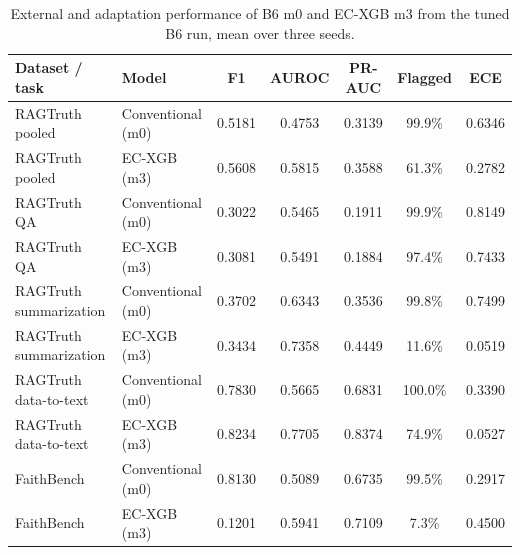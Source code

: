\documentclass[a4paper,fleqn]{cas-sc}
\begin{document}
\begin{table}[pos=htbp]
  \centering
  \caption{External and adaptation performance of B6 m0 and EC-XGB m3 from the tuned B6 run, mean over three seeds.}
  \label{tab:shift}
  \begin{tabular}{llccccc}
    \toprule
    \textbf{Dataset / task} & \textbf{Model} & \textbf{F1} & \textbf{AUROC} & \textbf{PR-AUC} & \textbf{Flagged} & \textbf{ECE} \\
    \midrule
    RAGTruth pooled         & Conventional (m0) & 0.5181      & 0.4753         & 0.3139          & 99.9\%           & 0.6346       \\
    RAGTruth pooled         & EC-XGB (m3)       & 0.5608      & 0.5815         & 0.3588          & 61.3\%           & 0.2782       \\
    \addlinespace
    RAGTruth QA             & Conventional (m0) & 0.3022      & 0.5465         & 0.1911          & 99.9\%           & 0.8149       \\
    RAGTruth QA             & EC-XGB (m3)       & 0.3081      & 0.5491         & 0.1884          & 97.4\%           & 0.7433       \\
    \addlinespace
    RAGTruth summarization  & Conventional (m0) & 0.3702      & 0.6343         & 0.3536          & 99.8\%           & 0.7499       \\
    RAGTruth summarization  & EC-XGB (m3)       & 0.3434      & 0.7358         & 0.4449          & 11.6\%           & 0.0519       \\
    \addlinespace
    RAGTruth data-to-text   & Conventional (m0) & 0.7830      & 0.5665         & 0.6831          & 100.0\%          & 0.3390       \\
    RAGTruth data-to-text   & EC-XGB (m3)       & 0.8234      & 0.7705         & 0.8374          & 74.9\%           & 0.0527       \\
    \addlinespace
    FaithBench              & Conventional (m0) & 0.8130      & 0.5089         & 0.6735          & 99.5\%           & 0.2917       \\
    FaithBench              & EC-XGB (m3)       & 0.1201      & 0.5941         & 0.7109          & 7.3\%            & 0.4500       \\
    \bottomrule
  \end{tabular}
\end{table}
\end{document}
